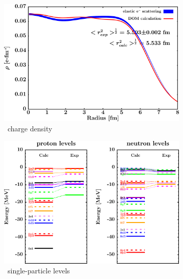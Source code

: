 \begin{figure}[hbtp]
    \captionsetup[subfigure]{labelformat=empty}
    \centering
    \begin{subfigure}[b]{0.45\textwidth}
        \centering
        \includegraphics[width=\linewidth]{figures/pb208_chargeDensity.png}
        \caption{\pbEight\ charge density}
        \label{DOMFitData_pb208_chargeDensity}
    \end{subfigure}\hspace{6pt}
    \begin{subfigure}[b]{0.45\textwidth}
        \centering
        \includegraphics[width=\linewidth]{figures/pb208_SPLevels.png}
        \caption{\pbEight\ single-particle levels}
        \label{DOMFitData_pb208_SPLevels}
    \end{subfigure}\vspace{0.3in}
    \begin{subfigure}[b]{0.45\textwidth}

\end{subfigure}
\end{figure}
